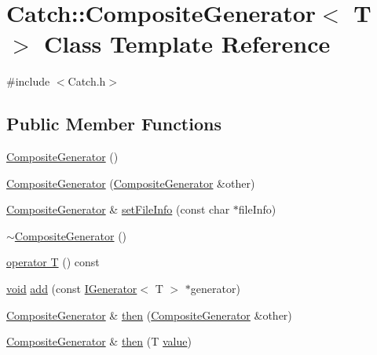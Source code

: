 \hypertarget{class_catch_1_1_composite_generator}{}\section{Catch\+:\+:Composite\+Generator$<$ T $>$ Class Template Reference}
\label{class_catch_1_1_composite_generator}


{\ttfamily \#include $<$Catch.\+h$>$}

\subsection*{Public Member Functions}
\begin{DoxyCompactItemize}
\item 
\hyperlink{class_catch_1_1_composite_generator_a923398b140371d1783858766864a1af5}{Composite\+Generator} ()
\item 
\hyperlink{class_catch_1_1_composite_generator_a21a7070a00e4a6fe021294c356692692}{Composite\+Generator} (\hyperlink{class_catch_1_1_composite_generator}{Composite\+Generator} \&other)
\item 
\hyperlink{class_catch_1_1_composite_generator}{Composite\+Generator} \& \hyperlink{class_catch_1_1_composite_generator_ac3c57cf4ca5472f440bf71e2936bcd4a}{set\+File\+Info} (const char $\ast$file\+Info)
\item 
\hyperlink{class_catch_1_1_composite_generator_a5766205abd7004c508c20ddbb5e5555e}{$\sim$\+Composite\+Generator} ()
\item 
\hyperlink{class_catch_1_1_composite_generator_aa3f627d84fb256df0404d19d7fd4b784}{operator T} () const 
\item 
\hyperlink{_s_d_l__opengles2__gl2ext_8h_ae5d8fa23ad07c48bb609509eae494c95}{void} \hyperlink{class_catch_1_1_composite_generator_af3774d42ad2d3453d089ca599efe0517}{add} (const \hyperlink{struct_catch_1_1_i_generator}{I\+Generator}$<$ T $>$ $\ast$generator)
\item 
\hyperlink{class_catch_1_1_composite_generator}{Composite\+Generator} \& \hyperlink{class_catch_1_1_composite_generator_a2e03f42df85cdd238aabd77a80b075d5}{then} (\hyperlink{class_catch_1_1_composite_generator}{Composite\+Generator} \&other)
\item 
\hyperlink{class_catch_1_1_composite_generator}{Composite\+Generator} \& \hyperlink{class_catch_1_1_composite_generator_aefdc11bcfccdf07d2db5f0da3ed8758c}{then} (T \hyperlink{_s_d_l__opengl__glext_8h_a8ad81492d410ff2ac11f754f4042150f}{value})
\end{DoxyCompactItemize}


